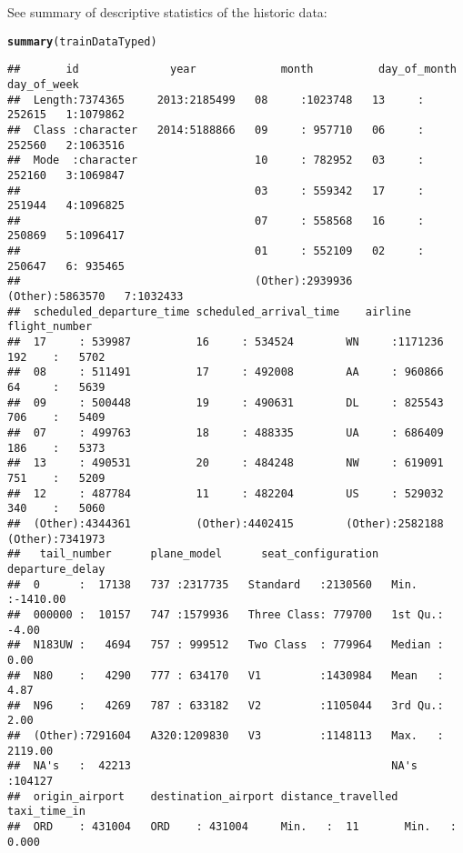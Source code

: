 \documentclass{article}\usepackage[]{graphicx}\usepackage[]{color}
\makeatletter
\newcommand{\hlstd}[1]{\textcolor[rgb]{0.345,0.345,0.345}{#1}}%
\newcommand{\hlkwd}[1]{\textcolor[rgb]{0.737,0.353,0.396}{\textbf{#1}}}%
\newenvironment{kframe}{%
 \def\at@end@of@kframe{}%
 \ifinner\ifhmode%
  \def\at@end@of@kframe{\end{minipage}}%
  \begin{minipage}{\columnwidth}%
 \fi\fi%
 \def\FrameCommand##1{\hskip\@totalleftmargin \hskip-\fboxsep
 \colorbox{shadecolor}{##1}\hskip-\fboxsep
     \hskip-\linewidth \hskip-\@totalleftmargin \hskip\columnwidth}%
 \MakeFramed {\advance\hsize-\width
   \@totalleftmargin\z@ \linewidth\hsize
   \@setminipage}}%
 {\par\unskip\endMakeFramed%
 \at@end@of@kframe}
\newenvironment{knitrout}{}{} %
\makeatother
\begin{document}
See summary of descriptive statistics of the historic data: 
\begin{knitrout}
\color{fgcolor}\begin{kframe}
\begin{alltt}
\hlkwd{summary}\hlstd{(trainDataTyped)}
\end{alltt}
\begin{verbatim}
##       id              year             month          day_of_month     day_of_week
##  Length:7374365     2013:2185499   08     :1023748   13     : 252615   1:1079862  
##  Class :character   2014:5188866   09     : 957710   06     : 252560   2:1063516  
##  Mode  :character                  10     : 782952   03     : 252160   3:1069847  
##                                    03     : 559342   17     : 251944   4:1096825  
##                                    07     : 558568   16     : 250869   5:1096417  
##                                    01     : 552109   02     : 250647   6: 935465  
##                                    (Other):2939936   (Other):5863570   7:1032433  
##  scheduled_departure_time scheduled_arrival_time    airline        flight_number    
##  17     : 539987          16     : 534524        WN     :1171236   192    :   5702  
##  08     : 511491          17     : 492008        AA     : 960866   64     :   5639  
##  09     : 500448          19     : 490631        DL     : 825543   706    :   5409  
##  07     : 499763          18     : 488335        UA     : 686409   186    :   5373  
##  13     : 490531          20     : 484248        NW     : 619091   751    :   5209  
##  12     : 487784          11     : 482204        US     : 529032   340    :   5060  
##  (Other):4344361          (Other):4402415        (Other):2582188   (Other):7341973  
##   tail_number      plane_model      seat_configuration  departure_delay   
##  0      :  17138   737 :2317735   Standard   :2130560   Min.   :-1410.00  
##  000000 :  10157   747 :1579936   Three Class: 779700   1st Qu.:   -4.00  
##  N183UW :   4694   757 : 999512   Two Class  : 779964   Median :    0.00  
##  N80    :   4290   777 : 634170   V1         :1430984   Mean   :    4.87  
##  N96    :   4269   787 : 633182   V2         :1105044   3rd Qu.:    2.00  
##  (Other):7291604   A320:1209830   V3         :1148113   Max.   : 2119.00  
##  NA's   :  42213                                        NA's   :104127    
##  origin_airport    destination_airport distance_travelled  taxi_time_in     
##  ORD    : 431004   ORD    : 431004     Min.   :  11       Min.   :   0.000  

\end{verbatim}
\end{kframe}
\end{knitrout}
\end{document}
